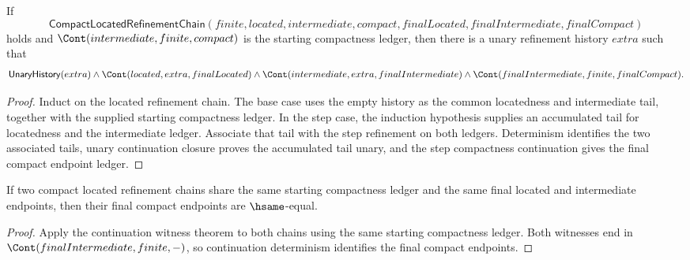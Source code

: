 \begin{theorem}
\label{thm:compact-located-refinement-chain-continuation-witness}
If
$$
\mathsf{CompactLocatedRefinementChain}(finite,located,intermediate,compact,
finalLocated,finalIntermediate,finalCompact)
$$
holds and $\Cont(intermediate,finite,compact)$ is the starting compactness
ledger, then there is a unary refinement history $extra$ such that
$$
\mathsf{UnaryHistory}(extra)\land
\Cont(located,extra,finalLocated)\land
\Cont(intermediate,extra,finalIntermediate)\land
\Cont(finalIntermediate,finite,finalCompact).
$$
\end{theorem}
\begin{proof}
Induct on the located refinement chain. The base case uses the empty history as
the common locatedness and intermediate tail, together with the supplied
starting compactness ledger. In the step case, the induction hypothesis supplies
an accumulated tail for locatedness and the intermediate ledger. Associate that
tail with the step refinement on both ledgers. Determinism identifies the two
associated tails, unary continuation closure proves the accumulated tail unary,
and the step compactness continuation gives the final compact endpoint ledger.
\end{proof}
\begin{theorem}\label{thm:compact-located-refinement-chain-final-compact-deterministic}
If two compact located refinement chains share the same starting compactness ledger and the same final located and intermediate endpoints, then their final compact endpoints are $\hsame$-equal.
\end{theorem}
\begin{proof}
Apply the continuation witness theorem to both chains using the same starting compactness ledger. Both witnesses end in $\Cont(finalIntermediate,finite,-)$, so continuation determinism identifies the final compact endpoints.
\end{proof}

